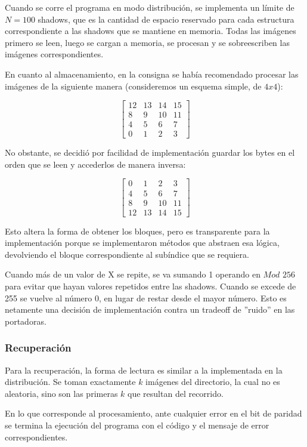 \documentclass[11pt]{scrartcl} %
\begin{document}
Cuando se corre el programa en modo distribución, se implementa un límite de $N = 100$ shadows, que es la cantidad de espacio reservado para cada estructura correspondiente a las shadows que se mantiene en memoria. Todas las imágenes primero se leen, luego se cargan a memoria, se procesan y se sobreescriben las imágenes correspondientes.

En cuanto al almacenamiento, en la consigna se había recomendado procesar las imágenes de la siguiente manera (consideremos un esquema simple, de $4x4$):

$$
\begin{bmatrix}
12 & 13 & 14 & 15 \\
8 & 9 & 10 & 11 \\
4 & 5 & 6 & 7 \\
0 & 1 & 2 & 3
\end{bmatrix}
$$

No obstante, se decidió por facilidad de implementación guardar los bytes en el orden que se leen y accederlos de manera inversa:

$$
\begin{bmatrix}
0 & 1 & 2 & 3 \\
4 & 5 & 6 & 7 \\
8 & 9 & 10 & 11 \\
12 & 13 & 14 & 15
\end{bmatrix}
$$

Esto altera la forma de obtener los bloques, pero es transparente para la implementación porque se implementaron métodos que abstraen esa lógica, devolviendo el bloque correspondiente al subíndice que se requiera.

Cuando más de un valor de X se repite, se va sumando 1 operando en $Mod$ $256$ para evitar que hayan valores repetidos entre las shadows. Cuando se excede de 255 se vuelve al número 0, en lugar de restar desde el mayor número. Esto es netamente una decisión de implementación contra un tradeoff de ''ruido'' en las portadoras.

\subsubsection{Recuperación}

Para la recuperación, la forma de lectura es similar a la implementada en la distribución. Se toman exactamente $k$ imágenes del directorio, la cual no es aleatoria, sino son las primeras $k$ que resultan del recorrido.

En lo que corresponde al procesamiento, ante cualquier error en el bit de paridad se termina la ejecución del programa con el código y el mensaje de error correspondientes.
\end{document}

